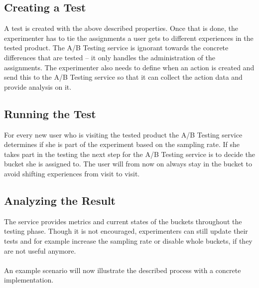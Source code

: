 \documentclass[main.tex]{subfiles}
\begin{document}
\subsection{Creating a Test} 
A test is created with the above described properties. Once that is done, the experimenter has to tie the assignments a user gets to different experiences in the tested product. The A/B Testing service is ignorant towards the concrete differences that are tested -- it only handles the administration of the assignments. The experimenter also needs to define when an action is created and send this to the A/B Testing service so that it can collect the action data and provide analysis on it.
\subsection{Running the Test}
For every new user who is visiting the tested product the A/B Testing service determines if she is part of the experiment based on the sampling rate. If she takes part in the testing the next step for the A/B Testing service is to decide the bucket she is assigned to. The user will from now on always stay in the bucket to avoid shifting experiences from visit to visit.
\subsection{Analyzing the Result}
The service provides metrics and current states of the buckets throughout the testing phase. Though it is not encouraged, experimenters can still update their tests and for example increase the sampling rate or disable whole buckets, if they are not useful anymore.
\\
\\
An example scenario will now illustrate the described process with a concrete implementation.
\end{document}
